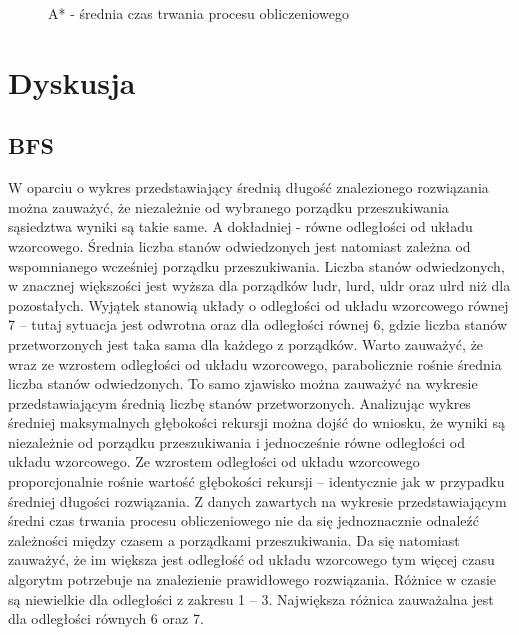 \documentclass{classrep}
\begin{document}
{\begin{figure}[ht!]
\begin{center}
		\caption{A* - średnia czas trwania procesu obliczeniowego}
	\end{center}
\end{figure}

}

\section{Dyskusja}
\subsection{BFS}
{\color{black}
W oparciu o wykres przedstawiający średnią długość znalezionego rozwiązania można zauważyć, że niezależnie od wybranego porządku przeszukiwania sąsiedztwa wyniki są takie same. A dokładniej - równe odległości od układu wzorcowego. Średnia liczba stanów odwiedzonych jest natomiast zależna od wspomnianego wcześniej porządku przeszukiwania. Liczba stanów odwiedzonych, w znacznej większości jest wyższa dla porządków ludr, lurd, uldr oraz ulrd niż dla pozostałych. Wyjątek stanowią układy o odległości od układu wzorcowego równej 7 – tutaj sytuacja jest odwrotna oraz dla odległości równej 6, gdzie liczba stanów przetworzonych jest taka sama dla każdego z porządków. Warto zauważyć, że wraz ze wzrostem odległości od układu wzorcowego, parabolicznie rośnie średnia liczba stanów odwiedzonych. To samo zjawisko można zauważyć na wykresie przedstawiającym średnią liczbę stanów przetworzonych. Analizując wykres średniej maksymalnych głębokości rekursji można dojść do wniosku, że wyniki są niezależnie od porządku przeszukiwania i jednocześnie równe odległości od układu wzorcowego. Ze wzrostem odległości od układu wzorcowego proporcjonalnie rośnie wartość głębokości rekursji – identycznie jak w przypadku średniej długości rozwiązania. 
Z danych zawartych na wykresie przedstawiającym średni czas trwania procesu obliczeniowego nie da się jednoznacznie odnaleźć zależności między czasem a porządkami przeszukiwania. Da się natomiast zauważyć, że im większa jest odległość od układu wzorcowego tym więcej czasu algorytm potrzebuje na znalezienie prawidłowego rozwiązania. Różnice w czasie są niewielkie dla odległości 
z zakresu 1 – 3. Największa różnica zauważalna jest dla odległości równych 6 oraz 7.}
\end{document}
